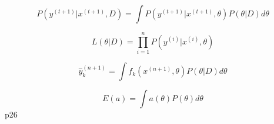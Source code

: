 \documentclass[11pt]{article}
\begin{document}
        \begin{equation} \label{predictiveProbDist}
            P(y^{(t+1)}| x^{(t+1)}, D) = \int P(y^{(t+1)}| x^{(t+1)},\theta) P (\theta| D) d\theta
        \end{equation}

        \begin{equation}
             L(\theta|  D) =  \prod_{i=1}^n P(y^{(i)}| x^{(i)}, \theta)
        \end{equation}



        \begin{equation}\label{predictiveSingleValueSQLoss}
            \hat{y}_k^{(n+1)} = \int f_k(x^{(n+1)}, \theta) P(\theta| D) d\theta
        \end{equation}

        \begin{equation}
            E(a) = \int a(\theta) P(\theta) d\theta
        \end{equation}
        p26





\end{document}
